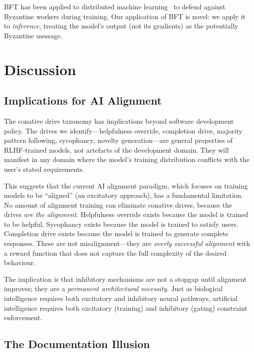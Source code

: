 \documentclass[11pt,a4paper]{article}
\begin{document}
BFT has been applied to distributed machine
learning~\citep{blanchard2017machine,yin2018byzantine} to defend
against Byzantine workers during training.  Our application of
BFT is novel: we apply it to \emph{inference}, treating the model's
output (not its gradients) as the potentially Byzantine message.

\section{Discussion}
\label{sec:discussion}

\subsection{Implications for AI Alignment}

The conative drive taxonomy has implications beyond software
development policy.  The drives we identify---helpfulness override,
completion drive, majority pattern following, sycophancy, novelty
generation---are general properties of RLHF-trained models, not
artefacts of the development domain.  They will manifest in any
domain where the model's training distribution conflicts with
the user's stated requirements.

This suggests that the current AI alignment paradigm, which focuses
on training models to be ``aligned'' (an excitatory approach), has
a fundamental limitation.  No amount of alignment training can
eliminate conative drives, because the drives \emph{are the alignment}.
Helpfulness override exists because the model is trained to be
helpful.  Sycophancy exists because the model is trained to satisfy
users.  Completion drive exists because the model is trained to
generate complete responses.  These are not misalignment---they are
\emph{overly successful alignment} with a reward function that does
not capture the full complexity of the desired behaviour.

The implication is that inhibitory mechanisms are not a stopgap
until alignment improves; they are a \emph{permanent architectural
necessity}.  Just as biological intelligence requires both excitatory
and inhibitory neural pathways, artificial intelligence requires
both excitatory (training) and inhibitory (gating) constraint
enforcement.

\subsection{The Documentation Illusion}
\end{document}
